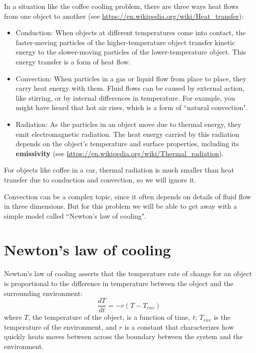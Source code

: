 \documentclass[12pt]{book}
\theoremstyle{exercise}
\begin{document}
In a situation like the coffee cooling problem, there are three ways heat flows from one object to another (see \url{https://en.wikipedia.org/wiki/Heat_transfer}):

\begin{itemize}

\item Conduction: When objects at different temperatures come into contact, the faster-moving particles of the higher-temperature object transfer kinetic energy to the slower-moving particles of the lower-temperature object.  This energy transfer is a form of heat flow.

\item Convection: When particles in a gas or liquid flow from place to place, they carry heat energy with them.  Fluid flows can be caused by external action, like stirring, or by internal differences in temperature.  For example, you might have heard that hot air rises, which is a form of ``natural convection".

\item Radiation: As the particles in an object move due to thermal energy, they emit electromagnetic radiation.  The heat energy carried by this radiation depends on the object's temperature and surface properties, including its {\bf emissivity} (see \url{https://en.wikipedia.org/wiki/Thermal_radiation}).

\end{itemize}

For objects like coffee in a car, thermal radiation is much smaller than 
heat transfer due to conduction and convection, so we will ignore it.

Convection can be a complex topic, since it often depends on details of fluid flow in three dimensions.  But for this problem we will be able to get away with a simple model called ``Newton's law of cooling".


\section{Newton's law of cooling}

Newton's law of cooling asserts that the temperature rate of change for an object is proportional to the difference in temperature between the object and the surrounding environment:
%
\[ \frac{dT}{dt} = -r (T - T_{env}) \]
%
where $T$, the temperature of the object, is a function of time, $t$; $T_{env}$ is the temperature of the environment, and $r$ is a constant that characterizes how quickly heats moves between across the boundary between the system and the environment.
\end{document}
